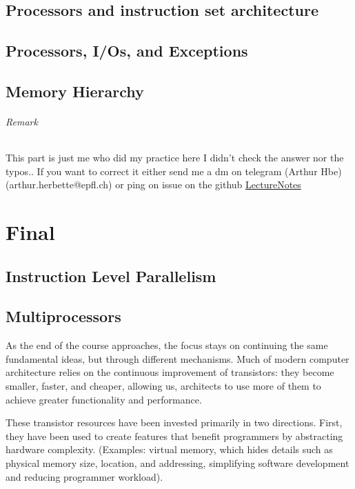 \documentclass{book}
\begin{document}
\chapter{Processors and instruction set architecture}





\chapter{Processors, I/Os, and Exceptions}





\chapter{Memory Hierarchy}



\paragraph{Remark}%
\label{par:Remark}
This part is just me who did my practice here I didn't check the answer nor the typos.. If you want to correct it either send me a dm on telegram (Arthur Hbe) (arthur.herbette@epfl.ch) or ping on issue on the github \href{https://github.com/Arthur926564/LectureNotes}{LectureNotes}

\part{Final}
\chapter{Instruction Level Parallelism}







\chapter{Multiprocessors}


As the end of the course approaches, the focus stays on continuing the same fundamental ideas, but through different mechanisms. Much of modern computer architecture relies on the continuous improvement of transistors: they become smaller, faster, and cheaper, allowing us, architects to use more of them to achieve greater functionality and performance.

These transistor resources have been invested primarily in two directions. First, they have been used to create features that benefit programmers by abstracting hardware complexity. (Examples: virtual memory, which hides details such as physical memory size, location, and addressing,  simplifying software development and reducing programmer workload).
\end{document}
